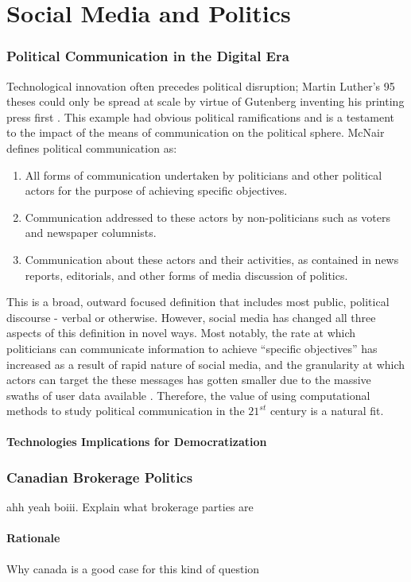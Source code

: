 \chapter{Social Media and Politics}\label{ch:SMandPolitics}

\subsection{Political Communication in the Digital Era}

Technological innovation often precedes political disruption; Martin Luther’s 95
theses could only be spread at scale by virtue of Gutenberg inventing his
printing press first \cite{gardels2019renovating}. This example had obvious
political ramifications and is a testament to the impact of the means of
communication on the political sphere. McNair defines political communication
as:

\begin{enumerate}
    \item All forms of communication undertaken by politicians and other
    political actors for the purpose of achieving specific objectives.
    \item Communication addressed to these actors by non-politicians such as
    voters and newspaper columnists.
    \item Communication about these actors and their activities, as contained in news reports, editorials, and other forms of media discussion of politics. \cite{mcnair2017introduction}
  \end{enumerate} 
This is a broad, outward focused definition that includes most public, political
discourse - verbal or otherwise. However, social media has changed all three
aspects of this definition in novel ways. Most notably, the rate at which
politicians can communicate information to achieve “specific objectives” has
increased as a result of rapid nature of social media, and the granularity at
which actors can target the these messages has gotten smaller due to the massive
swaths of user data available \cite{nickerson2014political}. Therefore, the
value of using computational methods to study political communication in the
$21^{st}$ century is a natural fit.

\subsubsection{Technologies Implications for Democratization}


\subsection{Canadian Brokerage Politics}

ahh yeah boiii. Explain what brokerage parties are

\subsubsection{Rationale}

Why canada is a good case for this kind of question